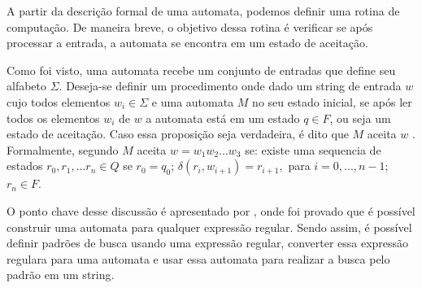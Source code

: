 A partir da descrição formal de uma automata, podemos definir uma rotina de computação.
De maneira breve, o objetivo dessa rotina é verificar se após processar a entrada, a automata se encontra em um estado de aceitação.

Como foi visto, uma automata recebe um conjunto de entradas que define seu alfabeto $\Sigma$.
Deseja-se definir um procedimento onde dado um string de entrada $w$ cujo todos elementos $w_i \in \Sigma$ e uma automata $M$ no seu estado inicial, se após ler todos os elementos $w_i$ de $w$ a automata está em um estado $q \in F$, ou seja um estado de aceitação.
Caso essa proposição seja verdadeira, é dito que $M$ aceita $w$ \cite{comp}.
Formalmente, segundo \cite{comp} $M$ aceita $w = w_1w_2...w_3$ se: existe uma sequencia de estados $r_0, r_1, ... r_n \in Q$ se $r_0 = q_0$; $\delta(r_i, w_{i+1}) = r_{i+1},$ para $i = 0, ..., n-1$; $r_n \in F$.

O ponto chave desse discussão é apresentado por \cite{comp}, onde foi provado que é possível construir uma automata para qualquer expressão regular.
Sendo assim, é possível definir padrões de busca usando uma expressão regular, converter essa expressão regulara para uma automata e usar essa automata para realizar a busca pelo padrão em um string.
